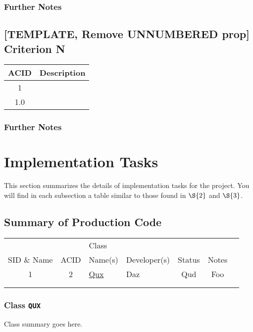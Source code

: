 \documentclass[11pt]{article}
\begin{document}
\subsubsection*{Further Notes}
\label{sec:org0bafc0a}


\subsection*{[TEMPLATE, Remove UNNUMBERED prop] Criterion N}
\label{sec:orgf4e293d}
\begin{center}
\begin{tabular}{|c|l|}
ACID & Description\\
\hline
1 & \\
\hline
1.0 & \\
\end{tabular}
\end{center}

\subsubsection*{Further Notes}
\label{sec:orga3658c3}
\section{Implementation Tasks}
\label{sec:orgfc8da86}
This section summarizes the details of implementation tasks for the project. You will find in each
subsection a table similar to those found in \hyperref[sec:org97af3de]{\(\S{2}\)} and \hyperref[sec:org921f311]{\(\S{3}\)}.

\subsection{Summary of Production Code}
\label{sec:orgcdac00a}

\begin{center}
\begin{tabular}{|c|c|p{3.5cm}|p{3.5cm}|c|c|c|}
 &  & Class &  &  & \\
SID \& Name & ACID & Name(s) & Developer(s) & Status & Notes\\
\hline
1 & 2 & \hyperref[sec:org92e7912]{Qux} & Daz & Qud & Foo\\
\hline
 &  &  &  &  & \\
\hline
 &  &  &  &  & \\
\end{tabular}
\end{center}


\subsubsection{Class \texttt{QUX}}
\label{sec:org92e7912}
Class summary goes here.
\end{document}
